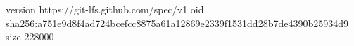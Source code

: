 version https://git-lfs.github.com/spec/v1
oid sha256:a751e9d8f4ad724bcefcc8875a61a12869e2339f1531dd28b7de4390b25934d9
size 228000
